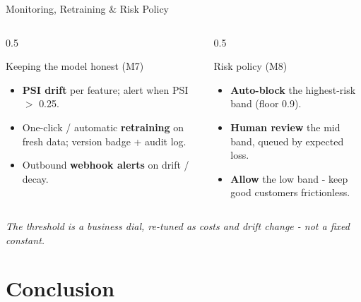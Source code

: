 \documentclass[t, aspectratio=169]{beamer} %
\begin{document}
\begin{frame}{Monitoring, Retraining \& Risk Policy}
	\begin{columns}[T]
		\begin{column}{0.5\textwidth}
			\begin{block}{Keeping the model honest (M7)}
				\begin{itemize}
					\item \textbf{PSI drift} per feature; alert when
					      PSI $>$ \alert{0.25}.
					\item One-click / automatic \textbf{retraining} on fresh data;
					      version badge + audit log.
					\item Outbound \textbf{webhook alerts} on drift / decay.
				\end{itemize}
			\end{block}
		\end{column}
		\begin{column}{0.5\textwidth}
			\begin{block}{Risk policy (M8)}
				\begin{itemize}
					\item \textbf{Auto-block} the highest-risk band (floor 0.9).
					\item \textbf{Human review} the mid band, queued by expected
					      loss.
					\item \textbf{Allow} the low band - keep good customers
					      frictionless.
				\end{itemize}
			\end{block}
		\end{column}
	\end{columns}
	\vspace{0.2em}
	\centering\small\emph{The threshold is a business dial, re-tuned as costs and
	drift change - not a fixed constant.}
\end{frame}

\section{Conclusion}
\end{document}
